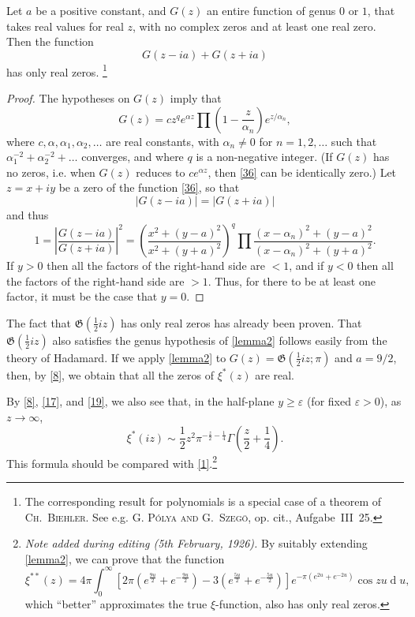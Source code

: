 \documentclass{article}
\theoremstyle{plain}
\newenvironment{lemma}[1]
  {\renewcommand\theinnercustomlemma{#1}\innercustomlemma}
  {\endinnercustomlemma}
\newcommand{\dd}{\operatorname{d}\!}
\newcommand{\GG}{\mathfrak{G}}
\newcommand{\oldpage}[1]{\marginpar{\footnotesize$\Big\vert$ \textit{p.~#1}}}
\begin{document}
\begin{lemma}{II}
\label{lemma2}
  Let $a$ be a positive constant, and $G(z)$ an entire function of genus $0$ or $1$, that takes real values for real $z$, with no complex zeros and at least one real zero.
  Then the function
  \[
  \label{36}
    G(z-ia) + G(z+ia)
  \tag{36}
  \]
  has only real zeros.
  \footnote{The corresponding result for polynomials is a special case of a theorem of \textsc{Ch.~Biehler}. See e.g. \textsc{G. P\'{o}lya and G.~Szeg\"{o}}, op. cit., Aufgabe~III~25.}
\end{lemma}
\begin{proof}
  The hypotheses on $G(z)$ imply that
  \[
    G(z) = c z^q e^{\alpha z} \prod\left(1-\frac{z}{\alpha_n}\right)e^{z/\alpha_n},
  \]
  where $c,\alpha,\alpha_1,\alpha_2,\ldots$ are real constants, with $\alpha_n\neq0$ for $n=1,2,\ldots$ such that $\alpha_1^{-2}+\alpha_2^{-2}+\ldots$ converges, and where $q$ is a non-negative integer.
  (If $G(z)$ has no zeros, i.e. when $G(z)$ reduces to $ce^{\alpha z}$, then \cref{36} can be identically zero.)
  Let $z=x+iy$ be a zero of the function \cref{36}, so that
  \[
    |G(z-ia)| = |G(z+ia)|
  \]
  and thus
  \[
    1
    =
    \left\vert
      \frac{G(z-ia)}{G(z+ia)}
    \right\vert^2
    =
    \left(
      \frac{x^2+(y-a)^2}{x^2+(y+a)^2}
    \right)^q
    \prod \frac{(x-\alpha_n)^2+(y-a)^2}{(x-\alpha_n)^2+(y+a)^2}.
  \]
\oldpage{317}
  If $y>0$ then all the factors of the right-hand side are $<1$, and if $y<0$ then all the factors of the right-hand side are $>1$.
  Thus, for there to be at least one factor, it must be the case that $y=0$.
\end{proof}

The fact that $\GG(\frac12 iz)$ has only real zeros has already been proven.
That $\GG(\frac12 iz)$ also satisfies the genus hypothesis of \cref{lemma2} follows easily from the theory of Hadamard.
If we apply \cref{lemma2} to $G(z)=\GG(\frac12 iz;\pi)$ and $a=9/2$, then, by \cref{8}, we obtain that all the zeros of $\xi^*(z)$ are real.

By \cref{8}, \cref{17}, and \cref{19}, we also see that, in the half-plane $y\geqslant\varepsilon$ (for fixed $\varepsilon>0$), as $z\to\infty$,
\[
  \xi^*(iz) \sim \frac12 z^2 \pi^{-\frac{z}{2}-\frac14} \Gamma\left(\frac{z}{2}+\frac14\right).
\]
This formula should be compared with \cref{1}.\footnote{\emph{Note added during editing (5th February, 1926).} By suitably extending \cref{lemma2}, we can prove that the function%
\[%
  \xi^{**}(z) = 4\pi\int_0^\infty\left[%
    2\pi\left(%
      e^{\frac{9u}{2}} + e^{-\frac{9u}{2}}%
    \right)%
    -3\left(%
      e^{\frac{5u}{2}} + e^{-\frac{5u}{2}}%
    \right)%
  \right]%
  e^{-\pi(e^{2u}+e^{-2u})} \cos zu \dd u,%
\]%
which ``better'' approximates the true $\xi$-function, also has only real zeros.}
\end{document}
